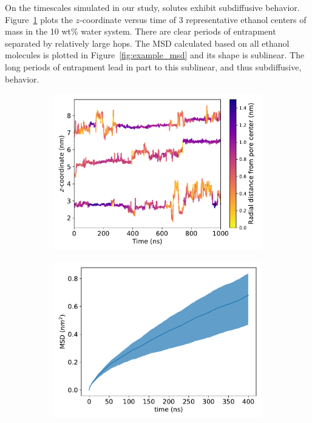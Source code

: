 \documentclass[journal=jpcbfk,manuscript=article]{achemso}
\begin{document}
  On the timescales simulated in our study, solutes exhibit subdiffusive
  behavior. Figure~\ref{fig:example_ztraces} plots the $z$-coordinate versus
  time of 3 representative ethanol centers of mass in the 10 wt\% water system.
  There are clear periods of entrapment separated by relatively large hops.
  The MSD calculated based on all ethanol molecules is plotted in 
  Figure~\ref{fig:example_msd} and its shape is sublinear. The long periods
  of entrapment lead in part to this sublinear, and thus subdiffusive, behavior.
  
  \begin{figure}[!htb]
  \centering
  \begin{subfigure}{0.49\textwidth}
  \includegraphics[width=\linewidth]{colorful_example_ztraces.pdf}
  \caption{}\label{fig:example_ztraces}
  \end{subfigure}
  \begin{subfigure}{0.49\textwidth}
  \includegraphics[width=\linewidth]{example_msd.pdf}

\end{subfigure}
\end{figure}
\end{document}
